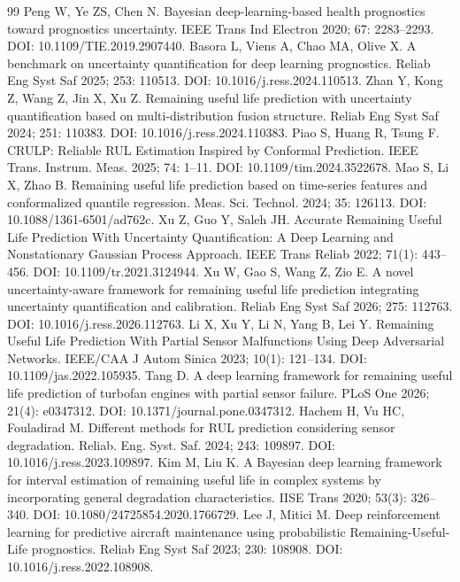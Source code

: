 \begin{thebibliography}{99}
\small
\setlength{\itemsep}{0pt}
 Peng W, Ye ZS, Chen N. Bayesian deep-learning-based health prognostics toward prognostics uncertainty. IEEE Trans Ind Electron 2020; 67: 2283–2293. DOI: 10.1109/TIE.2019.2907440.
 Basora L, Viens A, Chao MA, Olive X. A benchmark on uncertainty quantification for deep learning prognostics. Reliab Eng Syst Saf 2025; 253: 110513. DOI: 10.1016/j.ress.2024.110513.
 Zhan Y, Kong Z, Wang Z, Jin X, Xu Z. Remaining useful life prediction with uncertainty quantification based on multi-distribution fusion structure. Reliab Eng Syst Saf 2024; 251: 110383. DOI: 10.1016/j.ress.2024.110383.
 Piao S, Huang R, Tsung F. CRULP: Reliable RUL Estimation Inspired by Conformal Prediction. IEEE Trans. Instrum. Meas. 2025; 74: 1–11. DOI: 10.1109/tim.2024.3522678.
 Mao S, Li X, Zhao B. Remaining useful life prediction based on time-series features and conformalized quantile regression. Meas. Sci. Technol. 2024; 35: 126113. DOI: 10.1088/1361-6501/ad762c.
 Xu Z, Guo Y, Saleh JH. Accurate Remaining Useful Life Prediction With Uncertainty Quantification: A Deep Learning and Nonstationary Gaussian Process Approach. IEEE Trans Reliab 2022; 71(1): 443–456. DOI: 10.1109/tr.2021.3124944.
 Xu W, Gao S, Wang Z, Zio E. A novel uncertainty-aware framework for remaining useful life prediction integrating uncertainty quantification and calibration. Reliab Eng Syst Saf 2026; 275: 112763. DOI: 10.1016/j.ress.2026.112763.
 Li X, Xu Y, Li N, Yang B, Lei Y. Remaining Useful Life Prediction With Partial Sensor Malfunctions Using Deep Adversarial Networks. IEEE/CAA J Autom Sinica 2023; 10(1): 121–134. DOI: 10.1109/jas.2022.105935.
 Tang D. A deep learning framework for remaining useful life prediction of turbofan engines with partial sensor failure. PLoS One 2026; 21(4): e0347312. DOI: 10.1371/journal.pone.0347312.
 Hachem H, Vu HC, Fouladirad M. Different methods for RUL prediction considering sensor degradation. Reliab. Eng. Syst. Saf. 2024; 243: 109897. DOI: 10.1016/j.ress.2023.109897.
 Kim M, Liu K. A Bayesian deep learning framework for interval estimation of remaining useful life in complex systems by incorporating general degradation characteristics. IISE Trans 2020; 53(3): 326–340. DOI: 10.1080/24725854.2020.1766729.
 Lee J, Mitici M. Deep reinforcement learning for predictive aircraft maintenance using probabilistic Remaining-Useful-Life prognostics. Reliab Eng Syst Saf 2023; 230: 108908. DOI: 10.1016/j.ress.2022.108908.

\end{thebibliography}
